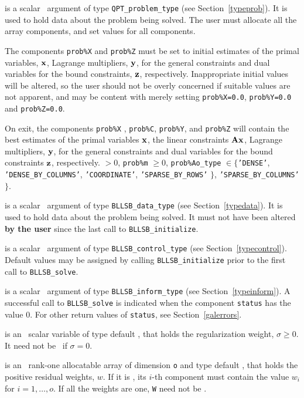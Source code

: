 \documentclass{galahad}
\newcommand{\packagename}{BLLSB}
\begin{document}
\begin{description}
 is a scalar \intentinout\ argument of type
{\tt QPT\_problem\_type}
(see Section~\ref{typeprob}).
It is used to hold data about the problem being solved.
The user must allocate all the array components,
and set values for all components.

The components {\tt prob\%X} and {\tt prob\%Z}
must be set to initial estimates of the primal variables, ${\mathbf{x}}$,
Lagrange multipliers, ${\mathbf{y}}$, for the general constraints
and dual variables for the bound constraints, ${\mathbf{z}}$, respectively.
Inappropriate initial values will be altered, so the user should
not be overly concerned if suitable values are not apparent, and may be
content with merely setting {\tt prob\%X=0.0}, {\tt prob\%Y=0.0}
and {\tt prob\%Z=0.0}.

On exit, the components {\tt prob\%X} , {\tt prob\%C}, {\tt prob\%Y},
and {\tt prob\%Z}
will contain the best estimates of the primal variables ${\mathbf{x}}$,
the linear constraints ${\mathbf{A}} {\mathbf{x}}$,
Lagrange multipliers, ${\mathbf{y}}$, for the general constraints
and dual variables for the bound constraints ${\mathbf{z}}$, respectively.
 $> 0$, {\tt prob\%m} $\geq 0$,
 {\tt prob\%Ao\_type} $\in \{${\tt 'DENSE'},
 {\tt 'DENSE\_BY\_COLUMNS'},
 {\tt 'COORDINATE'}, {\tt 'SPARSE\_BY\_\-ROWS'} $\}$,
 {\tt 'SPARSE\_BY\_\-COLUMNS'} $\}$.

 is a scalar \intentinout\ argument of type
{\tt \packagename\_data\_type}
(see Section~\ref{typedata}). It is used to hold data about the problem being
solved. It must not have been altered {\bf by the user} since the last call to
{\tt \packagename\_initialize}.

 is a scalar \intentin\ argument of type
{\tt \packagename\_control\_type}
(see Section~\ref{typecontrol}). Default values may be assigned by calling
{\tt \packagename\_initialize} prior to the first call to
{\tt \packagename\_solve}.

 is a scalar \intentinout\ argument of type
{\tt \packagename\_inform\_type}
(see Section~\ref{typeinform}).
A successful call to
{\tt \packagename\_solve}
is indicated when the  component {\tt status} has the value 0.
For other return values of {\tt status}, see Section~\ref{galerrors}.

 is an \optional\ scalar variable of type
default \realdp, that holds the regularization weight, $\sigma \geq 0$.
It need not be \present\ if $\sigma = 0$.

 is an \optional\ rank-one allocatable array of dimension {\tt o} and
type default \realdp, that holds the positive residual weights, $w$. If it
is \present, its $i$-th component must contain the value $w_{i}$ for
$i = 1, \ldots , o$.
If all the weights are one, {\tt W} need not be \present.

\end{description}
\end{document}
